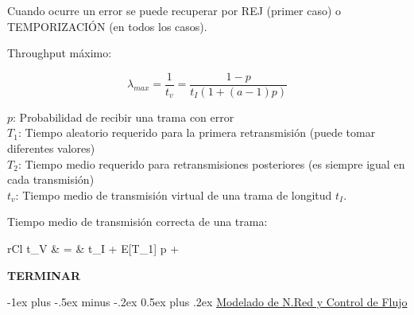 \documentclass[10pt,landscape]{article}
\makeatletter
\renewcommand{\section}{\@startsection{section}{1}{0mm}%
                                {-1ex plus -.5ex minus -.2ex}%
                                {0.5ex plus .2ex}%
                                {\normalfont\large\bfseries}}
\makeatother
\begin{document}
\begin{multicols}{3}
Cuando ocurre un error se puede recuperar por REJ (primer caso) o TEMPORIZACIÓN (en todos los casos).
	
Throughput máximo:

	\begin{equation*}
	\lambda_{max} = \frac{1}{t_{v}} = \frac{1 - p}{t_{I} (1 + (a - 1)p)}
	\end{equation*}

$p$: Probabilidad de recibir una trama con error\\
$T_{1}$: Tiempo aleatorio requerido para la primera retransmisión (puede tomar diferentes valores)\\
$T_{2}$: Tiempo medio requerido para retransmisiones posteriores (es siempre igual en cada transmisión)\\
$t_{v}$: Tiempo medio de transmisión virtual de una trama de longitud $t_{I}$.


Tiempo medio de transmisión correcta de una trama:

	\begin{IEEEeqnarray*}{rCl}
		t_{V} & = & t_{I} + E[T_{1}] p + 
	\end{IEEEeqnarray*}	


\textbf{TERMINAR}


\section{\underline{Modelado de N.Red y Control de Flujo}}

\begin{center}
\end{center}
\end{multicols}
\end{document}
